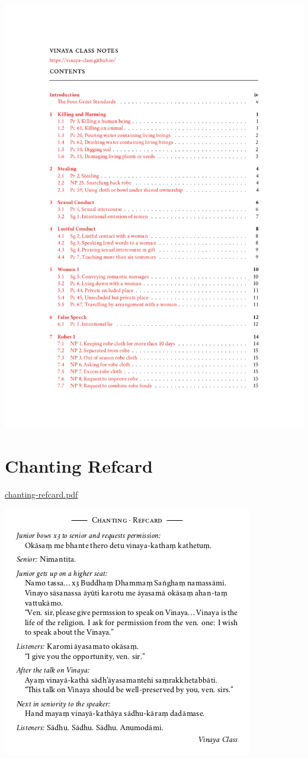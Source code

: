 \href{./includes/docs/vinaya-class-notes.pdf}{\includegraphics{./includes/docs/vinaya-class-notes-thumb.png}}

\section{Chanting Refcard}

\href{./includes/docs/chanting-refcard.pdf}{chanting-refcard.pdf}

\href{./includes/docs/chanting-refcard.pdf}{\includegraphics{./includes/docs/chanting-refcard-thumb.png}}

